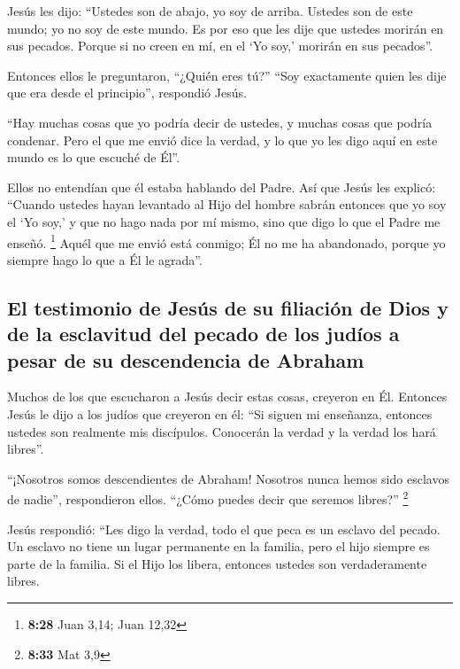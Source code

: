  Jesús les dijo: ``Ustedes son de abajo, yo soy de
arriba. Ustedes son de este mundo; yo no soy de este mundo.
 Es por eso que les dije que ustedes morirán en sus
pecados. Porque si no creen en mí, en el `Yo soy,' morirán en sus
pecados''.

 Entonces ellos le preguntaron, ``¿Quién eres tú?'' ``Soy
exactamente quien les dije que era desde el principio'', respondió
Jesús.

 ``Hay muchas cosas que yo podría decir de ustedes, y
muchas cosas que podría condenar. Pero el que me envió dice la verdad, y
lo que yo les digo aquí en este mundo es lo que escuché de Él''.

 Ellos no entendían que él estaba hablando del Padre. Así
que Jesús les explicó:  ``Cuando ustedes hayan levantado
al Hijo del hombre sabrán entonces que yo soy el `Yo soy,' y que no hago
nada por mí mismo, sino que digo lo que el Padre me enseñó. \footnote{\textbf{8:28}
  Juan 3,14; Juan 12,32}  Aquél que me envió está
conmigo; Él no me ha abandonado, porque yo siempre hago lo que a Él le
agrada''.

\hypertarget{el-testimonio-de-jesuxfas-de-su-filiaciuxf3n-de-dios-y-de-la-esclavitud-del-pecado-de-los-juduxedos-a-pesar-de-su-descendencia-de-abraham}{%
\subsection{El testimonio de Jesús de su filiación de Dios y de la
esclavitud del pecado de los judíos a pesar de su descendencia de
Abraham}\label{el-testimonio-de-jesuxfas-de-su-filiaciuxf3n-de-dios-y-de-la-esclavitud-del-pecado-de-los-juduxedos-a-pesar-de-su-descendencia-de-abraham}}

 Muchos de los que escucharon a Jesús decir estas cosas,
creyeron en Él.  Entonces Jesús le dijo a los judíos que
creyeron en él: ``Si siguen mi enseñanza, entonces ustedes son realmente
mis discípulos.  Conocerán la verdad y la verdad los hará
libres''.

 ``¡Nosotros somos descendientes de Abraham! Nosotros
nunca hemos sido esclavos de nadie'', respondieron ellos. ``¿Cómo puedes
decir que seremos libres?'' \footnote{\textbf{8:33} Mat 3,9}

 Jesús respondió: ``Les digo la verdad, todo el que peca
es un esclavo del pecado.  Un esclavo no tiene un lugar
permanente en la familia, pero el hijo siempre es parte de la familia.
 Si el Hijo los libera, entonces ustedes son
verdaderamente libres.

